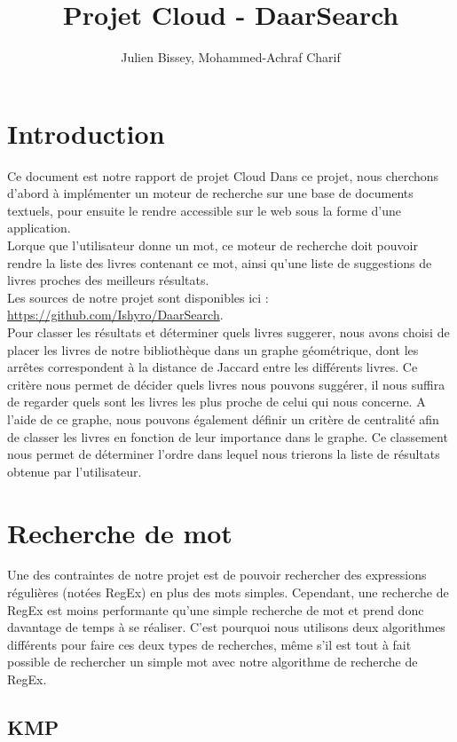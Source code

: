 \documentclass{article}
\title{Projet Cloud - DaarSearch}
\author{Julien Bissey, Mohammed-Achraf Charif}
\begin{document}
\maketitle

\section*{Introduction}

Ce document est notre rapport de projet Cloud
Dans ce projet, nous cherchons d'abord à implémenter un moteur de recherche sur une base de documents textuels, pour ensuite le rendre accessible sur le web sous la forme d'une application.\\
Lorque que l'utilisateur donne un mot, ce moteur de recherche doit pouvoir rendre la liste des livres contenant ce mot, ainsi qu'une liste de suggestions de livres proches des meilleurs résultats.\\
Les sources de notre projet sont disponibles ici : \url{https://github.com/Ishyro/DaarSearch}.\\
Pour classer les résultats et déterminer quels livres suggerer, nous avons choisi de placer les livres de notre bibliothèque dans un graphe géométrique, dont les arrêtes correspondent à la distance de Jaccard entre les différents livres. Ce critère nous permet de décider quels livres nous pouvons suggérer, il nous suffira de regarder quels sont les livres les plus proche de celui qui nous concerne. A l'aide de ce graphe, nous pouvons également définir un critère de centralité afin de classer les livres en fonction de leur importance dans le graphe. Ce classement nous permet de déterminer l'ordre dans lequel nous trierons la liste de résultats obtenue par l'utilisateur.

\section{Recherche de mot}

Une des contraintes de notre projet est de pouvoir rechercher des expressions régulières (notées RegEx) en plus des mots simples. Cependant, une recherche de RegEx est moins performante qu'une simple recherche de mot et prend donc davantage de temps à se réaliser. C'est pourquoi nous utilisons deux algorithmes différents pour faire ces deux types de recherches, même s'il est tout à fait possible de rechercher un simple mot avec notre algorithme de recherche de RegEx.

\subsection{KMP}
\end{document}
